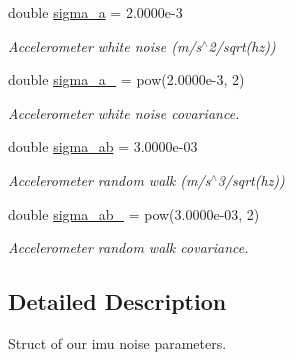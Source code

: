 \begin{DoxyCompactItemize}
double \hyperlink{structov__msckf_1_1NoiseManager_a6dee9928908bd58d9628176d9088b3b9}{sigma\+\_\+a} = 2.\+0000e-\/3
\begin{DoxyCompactList}\small\item\em Accelerometer white noise (m/s$^\wedge$2/sqrt(hz)) \end{DoxyCompactList}\item 
\mbox{\label{structov__msckf_1_1NoiseManager_ad1997253aae2e7df977d9b752255bda6}} 
double \hyperlink{structov__msckf_1_1NoiseManager_ad1997253aae2e7df977d9b752255bda6}{sigma\+\_\+a\+\_} = pow(2.\+0000e-\/3, 2)
\begin{DoxyCompactList}\small\item\em Accelerometer white noise covariance. \end{DoxyCompactList}\item 
\mbox{\label{structov__msckf_1_1NoiseManager_a31ddf8bc77fedc830ed28a8eac9a49c7}} 
double \hyperlink{structov__msckf_1_1NoiseManager_a31ddf8bc77fedc830ed28a8eac9a49c7}{sigma\+\_\+ab} = 3.\+0000e-\/03
\begin{DoxyCompactList}\small\item\em Accelerometer random walk (m/s$^\wedge$3/sqrt(hz)) \end{DoxyCompactList}\item 
\mbox{\label{structov__msckf_1_1NoiseManager_a568ec4370e05451c73c8d7de250c12e2}} 
double \hyperlink{structov__msckf_1_1NoiseManager_a568ec4370e05451c73c8d7de250c12e2}{sigma\+\_\+ab\+\_} = pow(3.\+0000e-\/03, 2)
\begin{DoxyCompactList}\small\item\em Accelerometer random walk covariance. \end{DoxyCompactList}\end{DoxyCompactItemize}


\subsection{Detailed Description}
Struct of our imu noise parameters. 